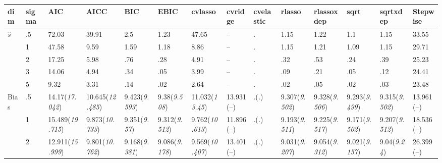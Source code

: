 \documentclass{article}
\begin{document}
\begin{table}[tbp] \centering
{}

{\tiny
\begin{tabularx}{\textwidth}{lCCCCCCCCCCCCC}

\toprule
{dim}&{sigma}&{AIC}&{AICC}&{BIC}&{EBIC}&{cvlasso}&{cvridge}&{cvelastic}&{rlasso}&{rlassoxdep}&{sqrt}&{sqrtxdep}&{Stepwise} \tabularnewline
\midrule\addlinespace[1.5ex]
$\hat{s}$&.5&72.03&39.91&2.5&1.23&47.65&--&.&1.15&1.22&1.1&1.15&33.55 \tabularnewline
&1&47.58&9.59&1.59&1.18&8.86&--&.&1.15&1.21&1.09&1.15&29.71 \tabularnewline
&2&17.25&5.98&.76&.28&4.91&--&.&.32&.53&.24&.39&25.23 \tabularnewline
&3&14.06&4.94&.34&.05&3.99&--&.&.09&.21&.05&.12&24.41 \tabularnewline
&5&9.32&3.31&.14&.02&2.64&--&.&.02&.05&.02&.03&23.48 \tabularnewline
\midrule Bias&.5&14.17\newline (\emph{17.042})&10.645\newline (\emph{12.485})&9.423\newline (\emph{9.593})&9.38\newline (\emph{9.508})&11.032\newline (\emph{13.45})&13.931\newline (--)&.\newline (\emph{.})&9.307\newline (\emph{9.502})&9.328\newline (\emph{9.506})&9.293\newline (\emph{9.499})&9.315\newline (\emph{9.502})&13.961\newline (--) \tabularnewline
&1&15.489\newline (\emph{19.715})&9.873\newline (\emph{10.733})&9.351\newline (\emph{9.57})&9.312\newline (\emph{9.512})&9.762\newline (\emph{10.613})&11.896\newline (--)&.\newline (\emph{.})&9.193\newline (\emph{9.511})&9.225\newline (\emph{9.517})&9.171\newline (\emph{9.502})&9.207\newline (\emph{9.512})&18.536\newline (--) \tabularnewline
&2&12.911\newline (\emph{15.999})&9.801\newline (\emph{10.762})&9.168\newline (\emph{9.381})&9.086\newline (\emph{9.178})&9.569\newline (\emph{10.407})&13.401\newline (--)&.\newline (\emph{.})&9.031\newline (\emph{9.207})&9.054\newline (\emph{9.312})&9.021\newline (\emph{9.157})&9.04\newline (\emph{9.24})&26.399\newline (--) \tabularnewline

\end{tabularx}}
\end{table}
\end{document}
